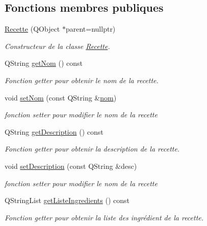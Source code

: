 \subsection*{Fonctions membres publiques}
\begin{DoxyCompactItemize}
\item 
\hyperlink{classRecette_a23c2060e8d97d05f5f9b9178b7efdf65}{Recette} (Q\+Object $\ast$parent=nullptr)
\begin{DoxyCompactList}\small\item\em Constructeur de la classe \hyperlink{classRecette}{Recette}. \end{DoxyCompactList}\item 
Q\+String \hyperlink{classRecette_afab5d7deab9130137037872a7a42ef3c}{get\+Nom} () const
\begin{DoxyCompactList}\small\item\em Fonction getter pour obtenir le nom de la recette. \end{DoxyCompactList}\item 
void \hyperlink{classRecette_a4880e64cbdc22a72600eee18cd0f921f}{set\+Nom} (const Q\+String \&\hyperlink{classRecette_a8923b8c64bab1afaa4595442bc7b5803}{nom})
\begin{DoxyCompactList}\small\item\em fonction setter pour modifier le nom de la recette \end{DoxyCompactList}\item 
Q\+String \hyperlink{classRecette_a7f3746b691f39d1b468b29819ad3c265}{get\+Description} () const
\begin{DoxyCompactList}\small\item\em Fonction getter pour obtenir la description de la recette. \end{DoxyCompactList}\item 
void \hyperlink{classRecette_afb1113cbbe6f3a0cda8eb47a5c9025a4}{set\+Description} (const Q\+String \&desc)
\begin{DoxyCompactList}\small\item\em fonction setter pour modifier le nom de la recette \end{DoxyCompactList}\item 
Q\+String\+List \hyperlink{classRecette_a3ca29579050212dea9da71e9c1f05119}{get\+Liste\+Ingredients} () const
\begin{DoxyCompactList}\small\item\em Fonction getter pour obtenir la liste des ingrédient de la recette. \end{DoxyCompactList}\item 

\end{DoxyCompactItemize}
